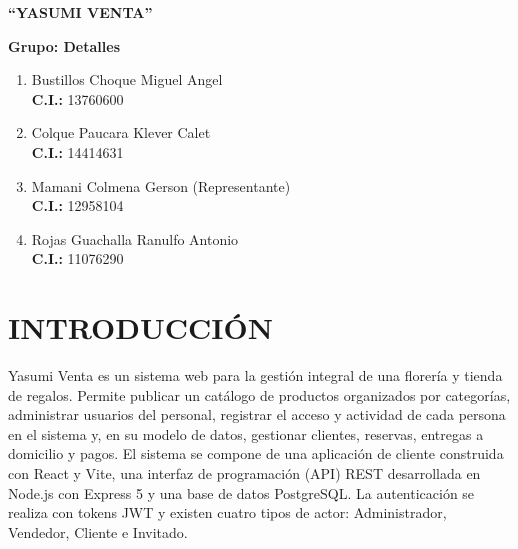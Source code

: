 \documentclass[12pt,letterpaper]{article}
\begin{document}
\begin{titlepage}
\vspace*{2.5cm}
\begin{center}
    {\fontsize{24}{28}\selectfont\bfseries ``YASUMI VENTA''\par}
    \vspace{2.5cm}
    {\Large\bfseries Grupo: Detalles\par}
\end{center}
\vspace{2.8cm}
\par
\vspace{0.4cm}
\begin{enumerate}[leftmargin=0.8cm,itemsep=8pt]
    \item Bustillos Choque Miguel Angel \\
          \textbf{C.I.:} 13760600
    \item Colque Paucara Klever Calet \\
          \textbf{C.I.:} 14414631
    \item Mamani Colmena Gerson (Representante) \\
          \textbf{C.I.:} 12958104
    \item Rojas Guachalla Ranulfo Antonio \\
          \textbf{C.I.:} 11076290
\end{enumerate}
\vfill
\end{titlepage}

\renewcommand{\contentsname}{ÍNDICE}
\tableofcontents
\clearpage
\section{INTRODUCCIÓN}

Yasumi Venta es un sistema web para la gestión integral de una florería y tienda de regalos. Permite publicar un catálogo de productos organizados por categorías, administrar usuarios del personal, registrar el acceso y actividad de cada persona en el sistema y, en su modelo de datos, gestionar clientes, reservas, entregas a domicilio y pagos. El sistema se compone de una aplicación de cliente construida con React y Vite, una interfaz de programación (API) REST desarrollada en Node.js con Express 5 y una base de datos PostgreSQL. La autenticación se realiza con tokens JWT y existen cuatro tipos de actor: Administrador, Vendedor, Cliente e Invitado.
\end{document}
